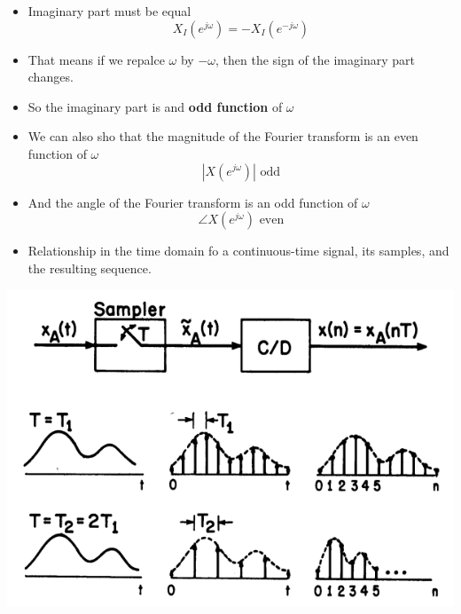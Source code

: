 \documentclass[pdflatex,compress,mathserif]{beamer}
\begin{document}
\begin{frame}
	\begin{itemize}
		\item Imaginary part must be equal
		\[ X_I(e^{j \omega}) = -X_I(e^{-j \omega}) \]
		\item That means if we repalce $\omega$ by $-\omega$, then the sign of the imaginary part changes.
		\item So the imaginary part is and \textbf{odd function} of $\omega$
	\end{itemize}
\end{frame}

\begin{frame}
	\begin{itemize}
		\item We can also sho that the magnitude of the Fourier transform is an even function of $\omega$
		\[ \left| X(e^{j\omega}) \right| \text{ odd}\]
		\item And the angle of the Fourier transform is an odd function of $\omega$
		\[ \angle X(e^{j\omega}) \text{ even} \]
	\end{itemize}
\end{frame}

\begin{frame}
	\begin{itemize}
		\item Relationship in the time domain fo a continuous-time signal, its samples, and the resulting sequence.
	\end{itemize}
	\begin{center}
		\includegraphics[width=0.7\linewidth]{img/img01}
	\end{center}
\end{frame}
\end{document}
